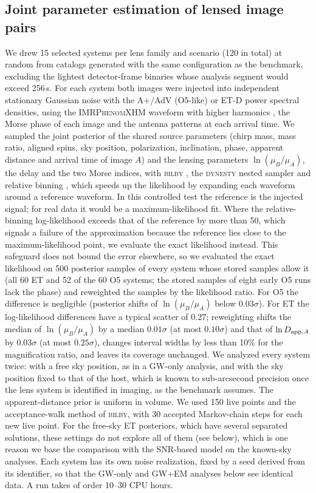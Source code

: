 \subsection{Joint parameter estimation of lensed image pairs}
\label{sec:jointpe}
We drew 15 selected systems per lens family and scenario (120 in total) at random from catalogs generated with the same configuration as the benchmark, excluding the lightest detector-frame binaries whose analysis segment would exceed 256\,s. For each system both images were injected into independent stationary Gaussian noise with the A+/AdV (O5-like) or ET-D power spectral densities, using the \textsc{IMRPhenomXHM} waveform with higher harmonics \citep{garciaquiros2020xhm}, the Morse phase of each image and the antenna patterns at each arrival time. We sampled the joint posterior of the shared source parameters (chirp mass, mass ratio, aligned spins, sky position, polarization, inclination, phase, apparent distance and arrival time of image $A$) and the lensing parameters $\ln(\mu_B/\mu_A)$, the delay and the two Morse indices, with \textsc{bilby} \citep{ashton2019bilby}, the \textsc{dynesty} nested sampler \citep{speagle2020dynesty} and relative binning \citep{zackay2018relbin,krishna2023relbin}, which speeds up the likelihood by expanding each waveform around a reference waveform. In this controlled test the reference is the injected signal; for real data it would be a maximum-likelihood fit. Where the relative-binning log-likelihood exceeds that of the reference by more than 50, which signals a failure of the approximation because the reference lies close to the maximum-likelihood point, we evaluate the exact likelihood instead. This safeguard does not bound the error elsewhere, so we evaluated the exact likelihood on 500 posterior samples of every system whose stored samples allow it (all 60 ET and 52 of the 60 O5 systems; the stored samples of eight early O5 runs lack the phase) and reweighted the samples by the likelihood ratio. For O5 the difference is negligible (posterior shifts of $\ln(\mu_B/\mu_A)$ below $0.03\sigma$). For ET the log-likelihood differences have a typical scatter of 0.27; reweighting shifts the median of $\ln(\mu_B/\mu_A)$ by a median $0.01\sigma$ (at most $0.10\sigma$) and that of $\ln D_{{\rm app},A}$ by $0.03\sigma$ (at most $0.25\sigma$), changes interval widths by less than 10\% for the magnification ratio, and leaves its coverage unchanged. We analyzed every system twice: with a free sky position, as in a GW-only analysis, and with the sky position fixed to that of the host, which is known to sub-arcsecond precision once the lens system is identified in imaging, as the benchmark assumes. The apparent-distance prior is uniform in volume. We used 150 live points and the acceptance-walk method of \textsc{bilby}, with 30 accepted Markov-chain steps for each new live point. For the free-sky ET posteriors, which have several separated solutions, these settings do not explore all of them (see below), which is one reason we base the comparison with the SNR-based model on the known-sky analyses. Each system has its own noise realization, fixed by a seed derived from its identifier, so that the GW-only and GW+EM analyses below see identical data. A run takes of order 10--30 CPU hours.

